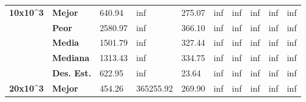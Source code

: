 \documentclass{article}
\begin{document}
\begin{table}[h!]
\begin{tabular}{|c|l|l|l|l|l|l|l|l|l|}
\multirow{5}{*}{\textbf{10x10\textasciicircum{}3}} & \textbf{Mejor}                            & 640.94                            & inf                               & 275.07                            & inf                               & inf                               & inf                               & inf                               & inf                               \\ \cline{2-10} 
                                                   & \textbf{Peor}                             & 2580.97                           & inf                               & 366.10                            & inf                               & inf                               & inf                               & inf                               & inf                               \\ \cline{2-10} 
                                                   & \textbf{Media}                            & 1501.79                           & inf                               & 327.44                            & inf                               & inf                               & inf                               & inf                               & inf                               \\ \cline{2-10} 
                                                   & \textbf{Mediana}                          & 1313.43                           & inf                               & 334.75                            & inf                               & inf                               & inf                               & inf                               & inf                               \\ \cline{2-10} 
                                                   & \textbf{Des. Est.}                        & 622.95                            & inf                               & 23.64                             & inf                               & inf                               & inf                               & inf                               & inf                               \\ \hline
\multirow{5}{*}{\textbf{20x10\textasciicircum{}3}} & \textbf{Mejor}                            & 454.26                            & 365255.92                         & 269.90                            & inf                               & inf                               & inf                               & inf                               & inf                               \\ \cline{2-10} 

\end{tabular}
\end{table}
\end{document}
